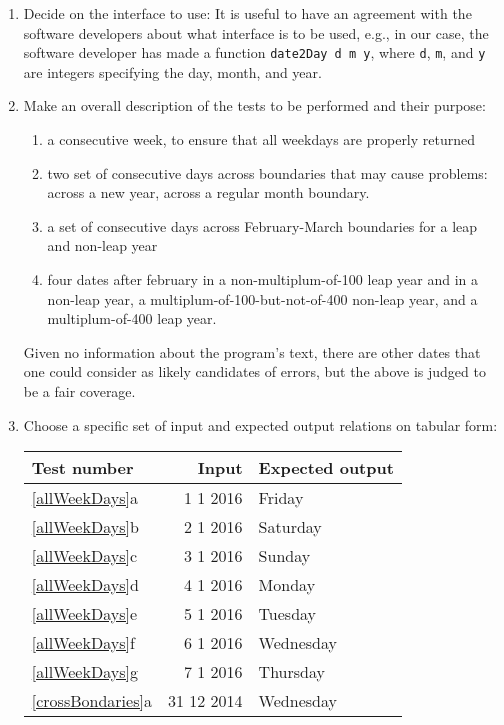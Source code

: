 \begin{enumerate}[label=]
\item Decide on the interface to use: It is useful to have an agreement with the software developers about what interface is to be used, e.g., in our case, the software developer has made a function \lstinline!date2Day d m y!, where \lstinline!d!, \lstinline!m!, and \lstinline!y! are integers specifying the day, month, and year.
\item Make an overall description of the tests to be performed and their purpose:
  \begin{enumerate}[label=\arabic*]
  \item\label{allWeekDays} a consecutive week, to ensure that all weekdays are properly returned
  \item\label{crossBondaries} two set of consecutive days across boundaries that may cause problems: across a new year, across a regular month boundary.
  \item\label{februaryBoundaries} a set of consecutive days across February-March boundaries for a leap and non-leap year
  \item\label{leapYears} four dates after february in a non-multiplum-of-100 leap year and in a non-leap year, a multiplum-of-100-but-not-of-400 non-leap year, and a multiplum-of-400 leap year.
  \end{enumerate}
  Given no information about the program's text, there are other dates that one could consider as likely candidates of errors, but the above is judged to be a fair coverage.
\item Choose a specific set of input and expected output relations on tabular form:
\begin{center}
  \begin{tabular}{|l|r|l|}
    \hline
    \rowcolor{headerRowColor} Test number&Input& Expected output\\
    \hline
    \ref{allWeekDays}a&1 1 2016&Friday\\
    \ref{allWeekDays}b&2 1 2016&Saturday\\
    \ref{allWeekDays}c&3 1 2016&Sunday\\
    \ref{allWeekDays}d&4 1 2016&Monday\\
    \ref{allWeekDays}e&5 1 2016&Tuesday\\
    \ref{allWeekDays}f&6 1 2016&Wednesday\\
    \ref{allWeekDays}g&7 1 2016&Thursday\\
    \hline
    \ref{crossBondaries}a&31 12 2014&Wednesday\\

\end{tabular}
\end{center}
\end{enumerate}
